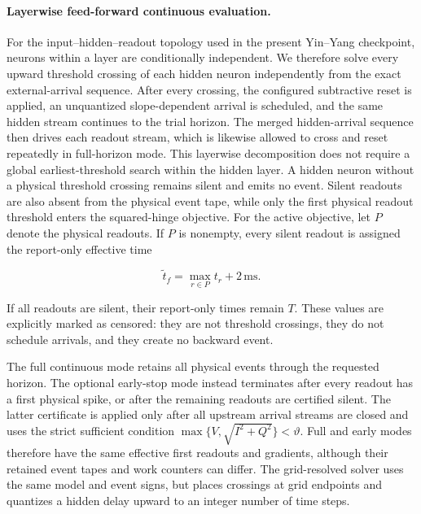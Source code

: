 \paragraph{Layerwise feed-forward continuous evaluation.}
For the input--hidden--readout topology used in the present Yin--Yang
checkpoint, neurons within a layer are conditionally independent.  We
therefore solve every upward threshold crossing of each hidden neuron
independently from the exact external-arrival sequence.  After every crossing,
the configured subtractive reset is applied, an unquantized slope-dependent
arrival is scheduled, and the same hidden stream continues to the trial
horizon.  The merged hidden-arrival sequence then drives each readout stream,
which is likewise allowed to cross and reset repeatedly in full-horizon mode.
This layerwise decomposition does not require a global earliest-threshold
search within the hidden layer.  A hidden neuron without a physical threshold
crossing remains silent and emits no event.  Silent readouts are also absent
from the physical event tape, while only the first physical readout threshold
enters the squared-hinge objective.
For the active objective, let $P$ denote
the physical readouts.  If $P$ is nonempty, every silent readout is assigned
the report-only effective time

\begin{equation}
    \widetilde t_f=\max_{r\in P}t_r+2\,\mathrm{ms}.
    \label{eq:tes-fake-readout-time}
\end{equation}

If all readouts are silent, their report-only times remain $T$.  These values
are explicitly marked as censored: they are not threshold crossings, they do
not schedule arrivals, and they create no backward event.

The full continuous mode retains all physical events through the requested
horizon.  The optional early-stop mode instead terminates after every readout
has a first physical spike, or after the remaining readouts are certified
silent.  The latter certificate is applied only after all upstream arrival
streams are closed and uses the strict sufficient condition
$\max\{V,\sqrt{I^2+Q^2}\}<\vartheta$.  Full and early modes therefore have the
same effective first readouts and gradients, although their retained event
tapes and work counters can differ.  The grid-resolved solver uses the same
model and event signs, but places crossings at grid endpoints and quantizes a
hidden delay upward to an integer number of time steps.

